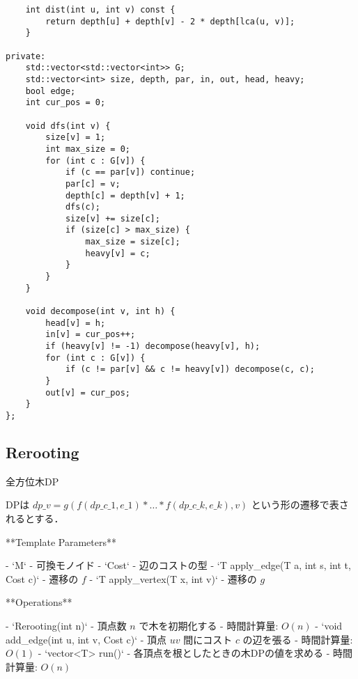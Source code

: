 \begin{lstlisting}
    int dist(int u, int v) const {
        return depth[u] + depth[v] - 2 * depth[lca(u, v)];
    }

private:
    std::vector<std::vector<int>> G;
    std::vector<int> size, depth, par, in, out, head, heavy;
    bool edge;
    int cur_pos = 0;

    void dfs(int v) {
        size[v] = 1;
        int max_size = 0;
        for (int c : G[v]) {
            if (c == par[v]) continue;
            par[c] = v;
            depth[c] = depth[v] + 1;
            dfs(c);
            size[v] += size[c];
            if (size[c] > max_size) {
                max_size = size[c];
                heavy[v] = c;
            }
        }
    }

    void decompose(int v, int h) {
        head[v] = h;
        in[v] = cur_pos++;
        if (heavy[v] != -1) decompose(heavy[v], h);
        for (int c : G[v]) {
            if (c != par[v] && c != heavy[v]) decompose(c, c);
        }
        out[v] = cur_pos;
    }
};

\end{lstlisting}

\subsection{Rerooting}

\begin{small}
\begin{markdown}
全方位木DP

DPは $dp\_v = g(f(dp\_{c\_1}, e\_1) * \dots * f(dp\_{c\_k}, e\_k), v)$ という形の遷移で表されるとする．

**Template Parameters**

- `M`
    - 可換モノイド
- `Cost`
    - 辺のコストの型
- `T apply\_edge(T a, int s, int t, Cost c)`
    - 遷移の $f$
- `T apply\_vertex(T x, int v)`
    - 遷移の $g$

**Operations**

- `Rerooting(int n)`
    - 頂点数 $n$ で木を初期化する
    - 時間計算量: $O(n)$
- `void add\_edge(int u, int v, Cost c)`
    - 頂点 $uv$ 間にコスト $c$ の辺を張る
    - 時間計算量: $O(1)$
- `vector<T> run()`
    - 各頂点を根としたときの木DPの値を求める
    - 時間計算量: $O(n)$

\end{markdown}
\end{small}

